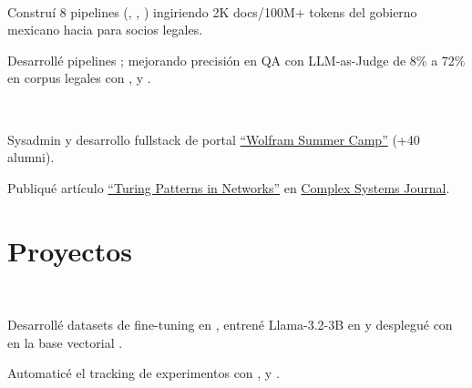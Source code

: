 \documentclass{tex/deedy-resume-openfont}
\begin{document}
\begin{minipage}[t]{0.67\textwidth}
\\
\begin{tightemize}
    \item Construí 8 pipelines  (, , ) ingiriendo 2K docs/100M+ tokens del gobierno mexicano hacia  para socios legales.
    \item Desarrollé pipelines ; mejorando precisión en QA con LLM-as-Judge de 8\% a 72\% en corpus legales con ,  y .
\end{tightemize}
\sectionsep

\\
\begin{tightemize}
    \item Sysadmin y desarrollo fullstack de portal \href{https://www.notebookarchive.org/collection-pod?collection=wolfram-summer-school-2021}{``Wolfram Summer Camp''} (+40 alumni).
    \item Publiqué artículo \href{https://www.complex-systems.com/abstracts/v32_i03_a02/}{``Turing Patterns in Networks''} en \href{https://www.complex-systems.com/}{Complex Systems Journal}.
\end{tightemize}
\sectionsep


\section{Proyectos}

\\
\begin{tightemize}
    \item Desarrollé datasets de fine-tuning en , entrené Llama-3.2-3B en  y desplegué con  en la base vectorial .
    \item Automaticé el tracking de experimentos con ,  y .
\end{tightemize}
\sectionsep


\end{minipage}
\end{document}
